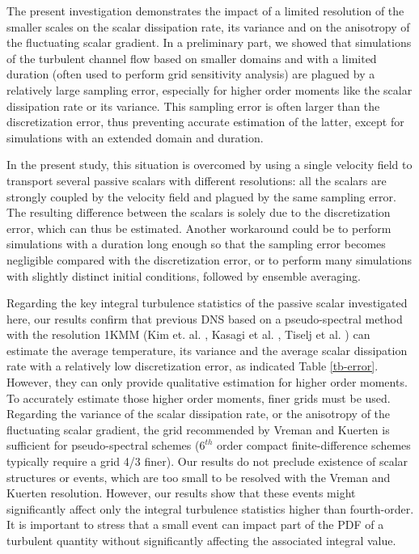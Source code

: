 \documentclass[review]{elsarticle}
\begin{document}
The present investigation demonstrates the impact of {\color{red} a limited resolution of the} smaller scales on the scalar dissipation rate, its variance and on the anisotropy of the fluctuating scalar gradient. In a preliminary part, we showed that simulations of the turbulent channel flow based on smaller domains and with a limited duration (often used to perform grid sensitivity analysis) are plagued by a relatively large sampling error, especially for higher order moments like the scalar dissipation rate or its variance. This sampling error is often larger than the discretization error, thus preventing accurate estimation of the latter, except for simulations with an extended domain and duration.

{\color{red} In the present study,} this situation is overcomed by using a single velocity field to transport several passive scalars with different resolutions: all the scalars are strongly coupled by the velocity field and plagued by the same sampling error. The resulting difference between the scalars is solely due to the discretization error, which can thus be estimated. {\color{red} Another workaround could be to perform simulations with a duration long enough so that the sampling error becomes negligible compared with the discretization error, or to perform many simulations with slightly distinct initial conditions, followed by ensemble averaging.}

{\color{red} Regarding the key integral turbulence statistics of the passive scalar investigated here,} our results {\color{red}confirm} that previous DNS based on a pseudo-spectral method with the resolution 1KMM (Kim et. al. \cite{kim1987turbulence}, Kasagi et al. \cite{kasagi1991direct}, Tiselj et al. \cite{tiselj2001effect}) can estimate the average temperature, its variance and the average scalar dissipation rate with a relatively low discretization error, as indicated Table \ref{tb-error}. However, they can only provide qualitative estimation for higher order moments. To accurately estimate those higher order moments, finer grids must be used. Regarding the variance of the scalar dissipation rate, or the anisotropy of the fluctuating scalar gradient, the grid recommended by Vreman and Kuerten \cite{vreman2014comparison} is sufficient for pseudo-spectral schemes ({\color{red}$6^{th}$ order compact} finite-difference schemes {\color{red}typically} require a grid 4/3 finer). Our results do not preclude existence of scalar structures or events, which are too small to be resolved with the Vreman and Kuerten resolution. However, our results show that these events might {\color{red} significantly} affect only the {\color{red} integral} turbulence statistics higher than fourth-order. {\color{red} It is important to stress that a small event can impact part of the PDF of a turbulent quantity without significantly affecting the associated integral value.}
\end{document}
